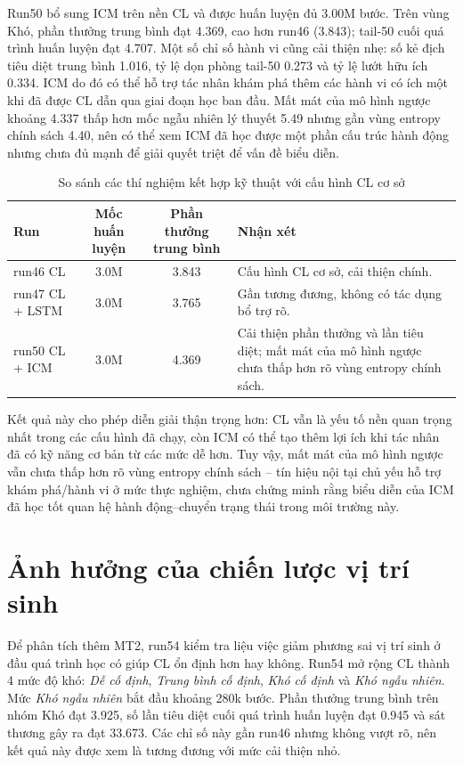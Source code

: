 Run50 bổ sung ICM trên nền CL và được huấn luyện đủ 3.00M bước. Trên vùng Khó, phần thưởng trung bình đạt 4.369, cao hơn run46 (3.843); tail-50 cuối quá trình huấn luyện đạt 4.707. Một số chỉ số hành vi cũng cải thiện nhẹ: số kẻ địch tiêu diệt trung bình 1.016, tỷ lệ dọn phòng tail-50 0.273 và tỷ lệ lướt hữu ích 0.334. ICM do đó có thể hỗ trợ tác nhân khám phá thêm các hành vi có ích một khi đã được CL dẫn qua giai đoạn học ban đầu. Mất mát của mô hình ngược khoảng 4.337 thấp hơn mốc ngẫu nhiên lý thuyết 5.49 nhưng gần vùng entropy chính sách 4.40, nên có thể xem ICM đã học được một phần cấu trúc hành động nhưng chưa đủ mạnh để giải quyết triệt để vấn đề biểu diễn.

\begin{table}[H]
    \centering
    \small
    \caption{So sánh các thí nghiệm kết hợp kỹ thuật với cấu hình CL cơ sở}
    \label{tab:stacking_tests}
    \begin{tabular}{|p{3.5cm}|c|c|p{4.2cm}|}
        \hline
        \textbf{Run} & \textbf{Mốc huấn luyện} & \textbf{Phần thưởng trung bình} & \textbf{Nhận xét} \\
        \hline
        run46 CL & 3.0M & 3.843 & Cấu hình CL cơ sở, cải thiện chính. \\
        \hline
        run47 CL + LSTM & 3.0M & 3.765 & Gần tương đương, không có tác dụng bổ trợ rõ. \\
        \hline
        run50 CL + ICM & 3.0M & 4.369 & Cải thiện phần thưởng và lần tiêu diệt; mất mát của mô hình ngược chưa thấp hơn rõ vùng entropy chính sách. \\
        \hline
    \end{tabular}
\end{table}

Kết quả này cho phép diễn giải thận trọng hơn: CL vẫn là yếu tố nền quan trọng nhất trong các cấu hình đã chạy, còn ICM có thể tạo thêm lợi ích khi tác nhân đã có kỹ năng cơ bản từ các mức dễ hơn. Tuy vậy, mất mát của mô hình ngược vẫn chưa thấp hơn rõ vùng entropy chính sách -- tín hiệu nội tại chủ yếu hỗ trợ khám phá/hành vi ở mức thực nghiệm, chưa chứng minh rằng biểu diễn của ICM đã học tốt quan hệ hành động--chuyển trạng thái trong môi trường này.

\section{Ảnh hưởng của chiến lược vị trí sinh}
\label{sec:spawn_strategy_results}

Để phân tích thêm MT2, run54 kiểm tra liệu việc giảm phương sai vị trí sinh ở đầu quá trình học có giúp CL ổn định hơn hay không. Run54 mở rộng CL thành 4 mức độ khó: \emph{Dễ cố định}, \emph{Trung bình cố định}, \emph{Khó cố định} và \emph{Khó ngẫu nhiên}. Mức \emph{Khó ngẫu nhiên} bắt đầu khoảng 280k bước. Phần thưởng trung bình trên nhóm Khó đạt 3.925, số lần tiêu diệt cuối quá trình huấn luyện đạt 0.945 và sát thương gây ra đạt 33.673. Các chỉ số này gần run46 nhưng không vượt rõ, nên kết quả này được xem là tương đương với mức cải thiện nhỏ.

